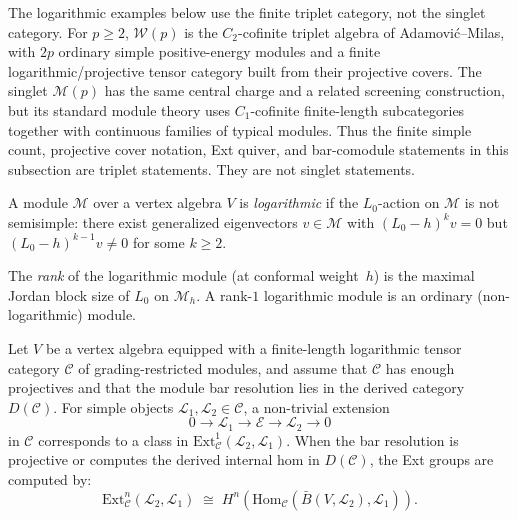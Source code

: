 \begin{remark}
\label{rem:triplet-singlet-module-boundary}
The logarithmic examples below use the finite triplet category, not
the singlet category. For $p\ge2$, $\mathcal W(p)$ is the
$C_2$-cofinite triplet algebra of Adamovi\'c--Milas, with $2p$
ordinary simple positive-energy modules and a finite
logarithmic/projective tensor category built from their projective
covers. The singlet $\mathcal M(p)$ has the same central charge and a
related screening construction, but its standard module theory uses
$C_1$-cofinite finite-length subcategories together with continuous
families of typical modules. Thus the finite simple count, projective
cover notation, Ext quiver, and bar-comodule statements in this
subsection are triplet statements. They are not singlet statements.
\end{remark}

\begin{definition}
\label{def:logarithmic-module}
A module $\mathcal{M}$ over a vertex algebra $V$ is
\emph{logarithmic} if the $L_0$-action on $\mathcal{M}$ is not
semisimple: there exist generalized eigenvectors
$v \in \mathcal{M}$ with $(L_0 - h)^k v = 0$ but
$(L_0 - h)^{k-1} v \neq 0$ for some $k \geq 2$.

The \emph{rank} of the logarithmic module (at conformal
weight~$h$) is the maximal Jordan block size of $L_0$ on
$\mathcal{M}_h$. A rank-$1$ logarithmic module is an ordinary
(non-logarithmic) module.
\end{definition}

\begin{proposition}
\label{prop:logarithmic-bar}
Let $V$ be a vertex algebra equipped with a finite-length logarithmic
tensor category $\mathcal C$ of grading-restricted modules, and assume
that $\mathcal C$ has enough projectives and that the module bar
resolution lies in the derived category $D(\mathcal C)$. For simple
objects $\mathcal{L}_1,\mathcal{L}_2\in\mathcal C$, a non-trivial
extension
\begin{equation}\label{eq:log-extension}
0 \to \mathcal{L}_1 \to \mathcal{E} \to \mathcal{L}_2 \to 0
\end{equation}
in $\mathcal C$ corresponds to a class in
$\mathrm{Ext}^1_{\mathcal C}(\mathcal{L}_2, \mathcal{L}_1)$.
When the bar resolution is projective or computes the derived
internal hom in $D(\mathcal C)$, the Ext groups are computed by:
\begin{equation}\label{eq:ext-bar}
\mathrm{Ext}^n_{\mathcal C}(\mathcal{L}_2, \mathcal{L}_1)
\;\cong\; H^n(\mathrm{Hom}_{\mathcal C}
(\bar{B}(V,\mathcal{L}_2),\mathcal{L}_1)).
\end{equation}
\end{proposition}

